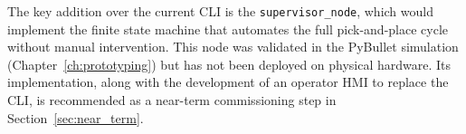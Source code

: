 The key addition over the current CLI is the \texttt{supervisor\_node}, which would implement the finite state machine that automates the full pick-and-place cycle without manual intervention. This node was validated in the PyBullet simulation (Chapter~\ref{ch:prototyping}) but has not been deployed on physical hardware. Its implementation, along with the development of an operator HMI to replace the CLI, is recommended as a near-term commissioning step in Section~\ref{sec:near_term}.